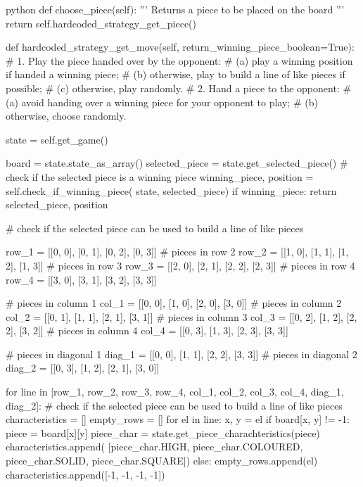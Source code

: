 \begin{mintedbox}{python}
    def choose_piece(self):
        '''
        Returns a piece to be placed on the board
        '''
        return self.hardcoded_strategy_get_piece()

    def hardcoded_strategy_get_move(self, return_winning_piece_boolean=True):
        #  1. Play the piece handed over by the opponent:
        # (a) play a winning position if handed a winning piece;
        # (b) otherwise, play to build a line of like pieces if possible;
        # (c) otherwise, play randomly.
        # 2. Hand a piece to the opponent:
        # (a) avoid handing over a winning piece for your opponent to play;
        # (b) otherwise, choose randomly.

        state = self.get_game()

        board = state.state_as_array()
        selected_piece = state.get_selected_piece()
        # check if the selected piece is a winning piece
        winning_piece, position = self.check_if_winning_piece(
            state, selected_piece)
        if winning_piece:
            return selected_piece, position

        # check if the selected piece can be used to build a line of like pieces

        row_1 = [[0, 0], [0, 1], [0, 2], [0, 3]]
        # pieces in row 2
        row_2 = [[1, 0], [1, 1], [1, 2], [1, 3]]
        # pieces in row 3
        row_3 = [[2, 0], [2, 1], [2, 2], [2, 3]]
        # pieces in row 4
        row_4 = [[3, 0], [3, 1], [3, 2], [3, 3]]

        # pieces in column 1
        col_1 = [[0, 0], [1, 0], [2, 0], [3, 0]]
        # pieces in column 2
        col_2 = [[0, 1], [1, 1], [2, 1], [3, 1]]
        # pieces in column 3
        col_3 = [[0, 2], [1, 2], [2, 2], [3, 2]]
        # pieces in column 4
        col_4 = [[0, 3], [1, 3], [2, 3], [3, 3]]

        # pieces in diagonal 1
        diag_1 = [[0, 0], [1, 1], [2, 2], [3, 3]]
        # pieces in diagonal 2
        diag_2 = [[0, 3], [1, 2], [2, 1], [3, 0]]

        for line in [row_1, row_2, row_3, row_4, col_1, col_2, col_3, col_4, diag_1, diag_2]:
            # check if the selected piece can be used to build a line of like pieces
            characteristics = []
            empty_rows = []
            for el in line:
                x, y = el
                if board[x, y] != -1:
                    piece = board[x][y]
                    piece_char = state.get_piece_charachteristics(piece)
                    characteristics.append(
                        [piece_char.HIGH, piece_char.COLOURED, piece_char.SOLID, piece_char.SQUARE])
                else:
                    empty_rows.append(el)
                    characteristics.append([-1, -1, -1, -1])


\end{mintedbox}
